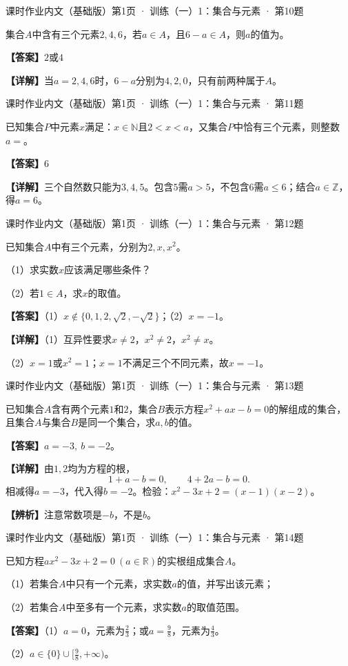 \documentclass[UTF8,10pt,aspectratio=169]{ctexbeamer}
\newcommand{\Answer}[1]{\par\vspace{0.2cm}\textbf{【答案】}#1}
\newcommand{\Analysis}[1]{\par\vspace{0.2cm}\textbf{【详解】}#1}
\newcommand{\R}{\mathbb R}
\newcommand{\N}{\mathbb N}
\newcommand{\Z}{\mathbb Z}
\newcommand{\blank}{\underline{\hspace{1.6cm}}}
\newcommand{\Tip}[1]{\par\vspace{0.2cm}\textbf{【辨析】}#1}
\newcommand{\Source}[1]{{\scriptsize\color{gray}#1}\par\vspace{0.25cm}}
\begin{document}
\begin{frame}
\Source{课时作业内文（基础版）第1页 · 训练（一）1：集合与元素 · 第10题}
集合$A$中含有三个元素$2,4,6$，若$a\in A$，且$6-a\in A$，则$a$的值为\blank。
\pause
\Answer{$2$或$4$}
\Analysis{当$a=2,4,6$时，$6-a$分别为$4,2,0$，只有前两种属于$A$。}
\end{frame}
\begin{frame}
\Source{课时作业内文（基础版）第1页 · 训练（一）1：集合与元素 · 第11题}
已知集合$P$中元素$x$满足：$x\in\N$且$2<x<a$，又集合$P$中恰有三个元素，则整数$a=$\blank。
\pause
\Answer{$6$}
\Analysis{三个自然数只能为$3,4,5$。包含$5$需$a>5$，不包含$6$需$a\le6$；结合$a\in\Z$，得$a=6$。}
\end{frame}
\begin{frame}
\Source{课时作业内文（基础版）第1页 · 训练（一）1：集合与元素 · 第12题}
已知集合$A$中有三个元素，分别为$2,x,x^2$。
\par （1）求实数$x$应该满足哪些条件？
\par （2）若$1\in A$，求$x$的取值。
\pause
\Answer{（1）$x\notin\{0,1,2,\sqrt2,-\sqrt2\}$；（2）$x=-1$。}
\Analysis{（1）互异性要求$x\ne2$，$x^2\ne2$，$x^2\ne x$。
\par （2）$x=1$或$x^2=1$；$x=1$不满足三个不同元素，故$x=-1$。}
\end{frame}
\begin{frame}
\Source{课时作业内文（基础版）第1页 · 训练（一）1：集合与元素 · 第13题}
已知集合$A$含有两个元素$1$和$2$，集合$B$表示方程$x^2+ax-b=0$的解组成的集合，且集合$A$与集合$B$是同一个集合，求$a,b$的值。
\pause
\Answer{$a=-3,\ b=-2$。}
\Analysis{由$1,2$均为方程的根，
\[1+a-b=0,\qquad4+2a-b=0.\]
相减得$a=-3$，代入得$b=-2$。检验：$x^2-3x+2=(x-1)(x-2)$。}
\Tip{注意常数项是$-b$，不是$b$。}
\end{frame}
\begin{frame}
\Source{课时作业内文（基础版）第1页 · 训练（一）1：集合与元素 · 第14题}
已知方程$ax^2-3x+2=0\ (a\in\R)$的实根组成集合$A$。
\par （1）若集合$A$中只有一个元素，求实数$a$的值，并写出该元素；
\par （2）若集合$A$中至多有一个元素，求实数$a$的取值范围。
\pause
\Answer{（1）$a=0$，元素为$\frac23$；或$a=\frac98$，元素为$\frac43$。\par （2）$a\in\{0\}\cup[\frac98,+\infty)$。}
\end{frame}
\end{document}
